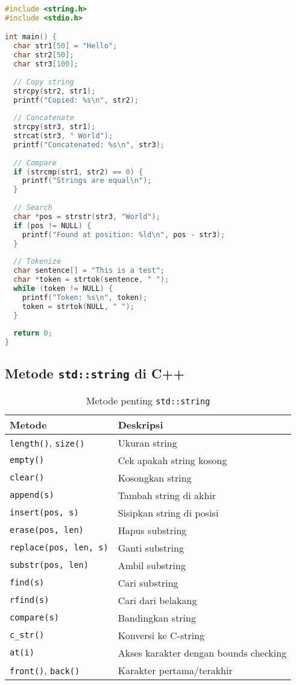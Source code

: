 \documentclass[../main.tex]{subfiles}
\begin{document}
\begin{lstlisting}[language=C, caption={Contoh fungsi string C}]
#include <string.h>
#include <stdio.h>

int main() {
  char str1[50] = "Hello";
  char str2[50];
  char str3[100];
  
  // Copy string
  strcpy(str2, str1);
  printf("Copied: %s\n", str2);
  
  // Concatenate
  strcpy(str3, str1);
  strcat(str3, " World");
  printf("Concatenated: %s\n", str3);
  
  // Compare
  if (strcmp(str1, str2) == 0) {
    printf("Strings are equal\n");
  }
  
  // Search
  char *pos = strstr(str3, "World");
  if (pos != NULL) {
    printf("Found at position: %ld\n", pos - str3);
  }
  
  // Tokenize
  char sentence[] = "This is a test";
  char *token = strtok(sentence, " ");
  while (token != NULL) {
    printf("Token: %s\n", token);
    token = strtok(NULL, " ");
  }
  
  return 0;
}
\end{lstlisting}

\subsection{Metode \texttt{std::string} di C++}

\begin{table}[H]
  \centering
  \caption{Metode penting \texttt{std::string}}
  \begin{tabular}{@{}lp{8cm}@{}}
    \toprule
    Metode & Deskripsi \\
    \midrule
    \texttt{length()}, \texttt{size()} & Ukuran string \\
    \texttt{empty()} & Cek apakah string kosong \\
    \texttt{clear()} & Kosongkan string \\
    \texttt{append(s)} & Tambah string di akhir \\
    \texttt{insert(pos, s)} & Sisipkan string di posisi \\
    \texttt{erase(pos, len)} & Hapus substring \\
    \texttt{replace(pos, len, s)} & Ganti substring \\
    \texttt{substr(pos, len)} & Ambil substring \\
    \texttt{find(s)} & Cari substring \\
    \texttt{rfind(s)} & Cari dari belakang \\
    \texttt{compare(s)} & Bandingkan string \\
    \texttt{c\_str()} & Konversi ke C-string \\
    \texttt{at(i)} & Akses karakter dengan bounds checking \\
    \texttt{front()}, \texttt{back()} & Karakter pertama/terakhir \\
    \bottomrule
  \end{tabular}
\end{table}
\end{document}
